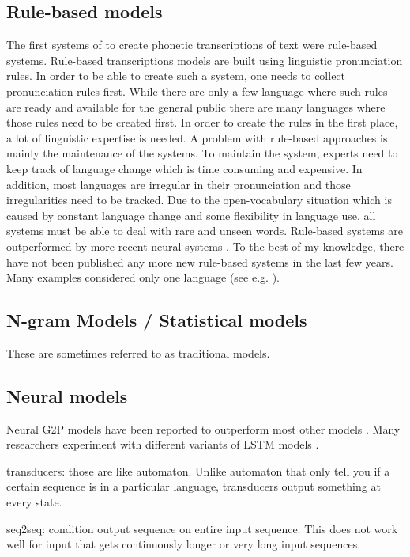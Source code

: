\subsection{Rule-based models}
The first systems of to create phonetic transcriptions of text were rule-based systems. Rule-based transcriptions models are built using linguistic pronunciation rules. In order to be able to create such a system, one needs to collect pronunciation rules first. While there are only a few language where such rules are ready and available for the general public there are many languages where those rules need to be created first. In order to create the rules in the first place, a lot of linguistic expertise is needed. A problem with rule-based approaches is mainly the maintenance of the systems. To maintain the system, experts need to keep track of language change which is time consuming and expensive. In addition, most languages are irregular in their pronunciation and those irregularities need to be tracked. Due to the open-vocabulary situation which is caused by constant language change and some flexibility in language use, all systems must be able to deal with rare and unseen words. Rule-based systems are outperformed by more recent neural systems \citep{gorman-etal-2020-sigmorphon, Ashby&Bartley.2021}. 
To the best of my knowledge, there have not been published any more new rule-based systems in the last few years. Many examples considered only one language (see e.g. \citep{rule-based2009}).

\subsection{N-gram Models / Statistical models}
These are sometimes referred to as traditional models. 


\subsection{Neural models}
Neural G2P models have been reported to outperform most other models \citep{Lee&Ashby.2020}. Many researchers experiment with different variants of LSTM models \citep{Lee&Ashby.2020, hammond-2021-data, gautam.2021}. 

transducers: those are like automaton. Unlike automaton that only tell you if a certain sequence is in a particular language, transducers output something at every state. 

seq2seq: condition output sequence on entire input sequence. This does not work well for input that gets continuously longer or very long input sequences. 

